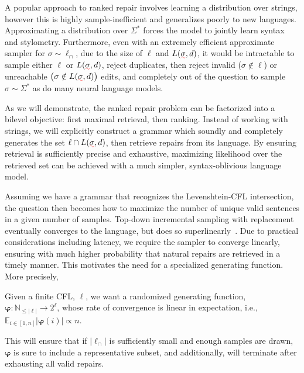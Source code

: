\documentclass[sigplan,acmsmall,nonacm,screen]{acmart}\settopmatter{printfolios=false,printccs=false,printacmref=false}
\begin{document}
  A popular approach to ranked repair involves learning a distribution over strings, however this is highly sample-inefficient and generalizes poorly to new languages. Approximating a distribution over $\Sigma^*$ forces the model to jointly learn syntax and stylometry. Furthermore, even with an extremely efficient approximate sampler for $\sigma \sim \ell_\cap$, due to the size of $\ell$ and $L(\err\sigma, d)$, it would be intractable to sample either $\ell$ or $L(\err\sigma, d)$, reject duplicates, then reject invalid ($\sigma \notin \ell$) or unreachable $\big(\sigma \notin L(\err\sigma, d)\big)$ edits, and completely out of the question to sample $\sigma \sim \Sigma^*$ as do many neural language models.

  As we will demonstrate, the ranked repair problem can be factorized into a bilevel objective: first maximal retrieval, then ranking. Instead of working with strings, we will explicitly construct a grammar which soundly and completely generates the set $\ell \cap L(\err\sigma, d)$, then retrieve repairs from its language. By ensuring retrieval is sufficiently precise and exhaustive, maximizing likelihood over the retrieved set can be achieved with a much simpler, syntax-oblivious language model.

  Assuming we have a grammar that recognizes the Levenshtein-CFL intersection, the question then becomes how to maximize the number of unique valid sentences in a given number of samples. Top-down incremental sampling with replacement eventually converges to the language, but does so superlinearly~\cite{flajolet1992birthday}. Due to practical considerations including latency, we require the sampler to converge linearly, ensuring with much higher probability that natural repairs are retrieved in a timely manner. This motivates the need for a specialized generating function. More precisely,

  \begin{definition}\label{def:linear-convergence}
    Given a finite CFL, $\ell$, we want a randomized generating function, $\bm{\varphi}: \mathbb{N}_{\leq|\ell|} \rightarrow 2^\ell$, whose rate of convergence is linear in expectation, i.e., $\mathbb{E}_{i \in [1, n]}|\bm{\varphi}(i)| \propto n$.
  \end{definition}

  \noindent This will ensure that if $|\ell_\cap|$ is sufficiently small and enough samples are drawn, $\bm\varphi$ is sure to include a representative subset, and additionally, will terminate after exhausting all valid repairs.
\end{document}
